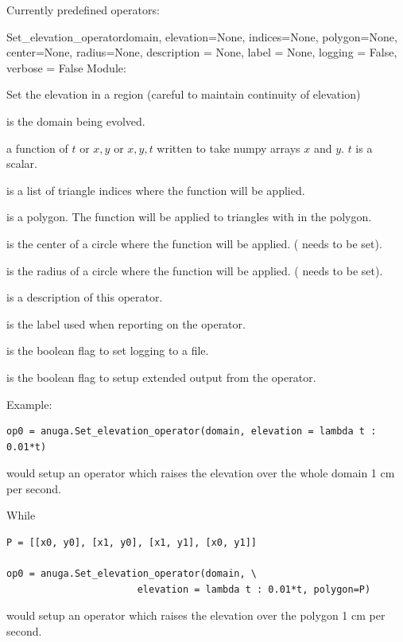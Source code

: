 \documentclass{manual}
\begin{document}
Currently predefined operators:


\begin{classdesc}{Set_elevation_operator}{domain,
                 elevation=None,
                 indices=None,
                 polygon=None,
                 center=None,
                 radius=None,
                 description = None,
                 label = None,
                 logging = False,
                 verbose = False}
Module: 

Set the elevation in a region (careful to maintain continuity of elevation)


 is the domain being evolved.

 a function of $t$ or $x,y$ or $x,y,t$ written to take numpy arrays $x$ and $y$. $t$ is a scalar.

 is a list of triangle indices where the function  will be applied.

 is a polygon. The function  will be applied to triangles with in the polygon.

 is the center of a circle where the function  will be applied. ( needs to be set).

 is the radius of a circle where the function  will be applied. ( needs to be set).

 is a description of this operator.

 is the label used when reporting on the operator.

 is the boolean flag to set logging to a file. 

 is the boolean flag to setup extended output from the operator. 

Example:

\begin{verbatim}
op0 = anuga.Set_elevation_operator(domain, elevation = lambda t : 0.01*t)
\end{verbatim}
would setup an operator which raises the elevation over the whole domain 1 cm per second.


While 
\begin{verbatim}
P = [[x0, y0], [x1, y0], [x1, y1], [x0, y1]] 

op0 = anuga.Set_elevation_operator(domain, \
                       elevation = lambda t : 0.01*t, polygon=P)
\end{verbatim}
would setup an operator which raises the elevation over the polygon  1 cm per second.

\end{classdesc}
\end{document}
